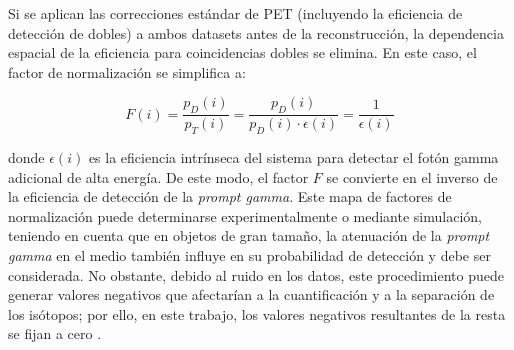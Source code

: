 Si se aplican las correcciones estándar de PET (incluyendo la eficiencia de detección de dobles) a ambos datasets antes de la reconstrucción, la dependencia espacial de la eficiencia para coincidencias dobles se elimina. En este caso, el factor de normalización se simplifica a:

\begin{equation}
      F(i) = \frac{p_D(i)}{p_T(i)} = \frac{p_D(i)}{p_D(i) \cdot \epsilon(i)} = \frac{1}{\epsilon(i)}
\end{equation}

donde $\epsilon(i)$ es la eficiencia intrínseca del sistema para detectar el fotón gamma adicional de alta energía. De este modo, el factor $F$ se convierte en el inverso de la eficiencia de detección de la \textit{prompt gamma}. Este mapa de factores de normalización puede determinarse experimentalmente o mediante simulación, teniendo en cuenta que en objetos de gran tamaño, la atenuación de la \textit{prompt gamma} en el medio también influye en su probabilidad de detección y debe ser considerada. No obstante, debido al ruido en los datos, este procedimiento puede generar valores negativos que afectarían a la cuantificación y a la separación de los isótopos; por ello, en este trabajo, los valores negativos resultantes de la resta se fijan a cero \parencite{Andreyev2011}.